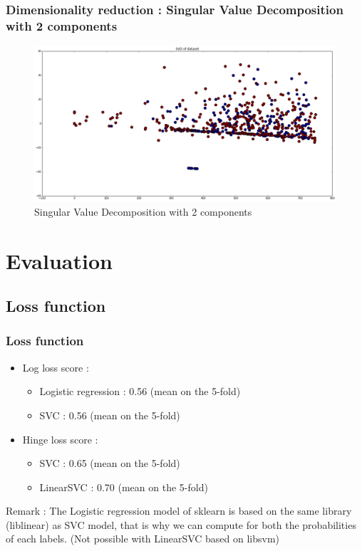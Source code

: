 \documentclass[10pt,handout,english]{beamer}
\begin{document}
		\begin{frame}
		\frametitle{Dimensionality reduction : Singular Value Decomposition with 2 components}
			\begin{figure}[h!]
            	\centering
                \includegraphics[width=\textwidth]{svd.png}
                \caption{Singular Value Decomposition with 2 components}
			\end{figure}
		\end{frame}

	\section{Evaluation}
		\subsection{Loss function}
		\begin{frame}
		\frametitle{Loss function}
			\begin{itemize}
				\item Log loss score :
				\begin{itemize}
					\item Logistic regression : 0.56 (mean on the 5-fold)
					\item SVC : 0.56 (mean on the 5-fold)
				\end{itemize}
				\item Hinge loss score :
				\begin{itemize}
					\item SVC : 0.65 (mean on the 5-fold)
					\item LinearSVC : 0.70 (mean on the 5-fold)
				\end{itemize}
			\end{itemize}
			Remark : The Logistic regression model of sklearn is based on the same library (liblinear) as SVC model, that is why we can compute for both the probabilities of each labels. (Not possible with LinearSVC based on libsvm)
		\end{frame}
\end{document}
